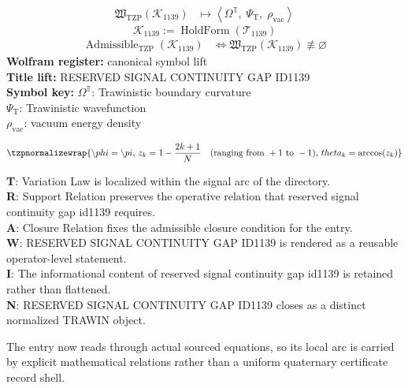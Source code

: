 \noindent
\begin{minipage}[t]{0.48\linewidth}
\begingroup
\small
\[
\begin{aligned}
\mathfrak{W}_{\mathrm{TZP}}\!\left(\mathcal{K}_{1139}\right)
&\longmapsto
\left\langle \Omega^{\mathbb{T}},\; \Psi_{\mathrm{T}},\; \rho_{\mathrm{vac}} \right\rangle
\end{aligned}
\]
\[
\mathcal{K}_{1139}
:=
\operatorname{HoldForm}\!\left(\mathcal{T}_{1139}\right)
\]
\[
\begin{aligned}
\operatorname{Admissible}_{\mathrm{TZP}}\!\left(\mathcal{K}_{1139}\right)
&\Longleftrightarrow
\mathfrak{W}_{\mathrm{TZP}}\!\left(\mathcal{K}_{1139}\right)\not\equiv\varnothing
\end{aligned}
\]
\textbf{Wolfram register:} canonical symbol lift\\
\textbf{Title lift:} RESERVED SIGNAL CONTINUITY GAP ID1139\\
\textbf{Symbol key:} \(\Omega^{\mathbb{T}}\): Trawinistic boundary curvature\\ \(\Psi_{\mathrm{T}}\): Trawinistic wavefunction\\ \(\rho_{\mathrm{vac}}\): vacuum energy density
\par
\endgroup
\end{minipage}\hfill
\begin{minipage}[t]{0.48\linewidth}
\[
\tzpnormalizewrap{\backslash phi=\backslash pi,\,z_k = 1 - \frac{2k+1}{N} \quad (\text{ranging from } +1 \text{ to } -1),\,theta_k = \arccos(z_k)}
\]

\small
\textbf{T}: Variation Law is localized within the signal arc of the directory.\\
\textbf{R}: Support Relation preserves the operative relation that reserved signal continuity gap id1139 requires.\\
\textbf{A}: Closure Relation fixes the admissible closure condition for the entry.\\
\textbf{W}: RESERVED SIGNAL CONTINUITY GAP ID1139 is rendered as a reusable operator-level statement.\\
\textbf{I}: The informational content of reserved signal continuity gap id1139 is retained rather than flattened.\\
\textbf{N}: RESERVED SIGNAL CONTINUITY GAP ID1139 closes as a distinct normalized TRAWIN object.
\normalsize
\end{minipage}

The entry now reads through actual sourced equations, so its local arc is carried by explicit mathematical relations rather than a uniform quaternary certificate record shell.
\clearpage

